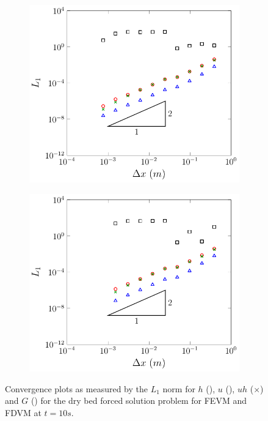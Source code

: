 \begin{figure}
	\centering
	\begin{subfigure}{0.5\textwidth}
		\includegraphics[width=\textwidth]{./chp5/figures/Forced/Dry/FEVML1.pdf}
		\vspace{0.5cm}
	\end{subfigure}%
	\begin{subfigure}{0.5\textwidth}
		\includegraphics[width=\textwidth]{./chp5/figures/Forced/Dry/FDVML1.pdf}
		\vspace{0.5cm}
	\end{subfigure}
	\caption{Convergence plots as measured by the $L_1$ norm for $h$ (), $u$ (),  $uh$ ({\color{green!60!black}$\times$})  and $G$ () for the dry bed forced solution problem for FEVM and FDVM at $t=10s$.}
	\label{fig:ForcedSolDryL1}
\end{figure}

